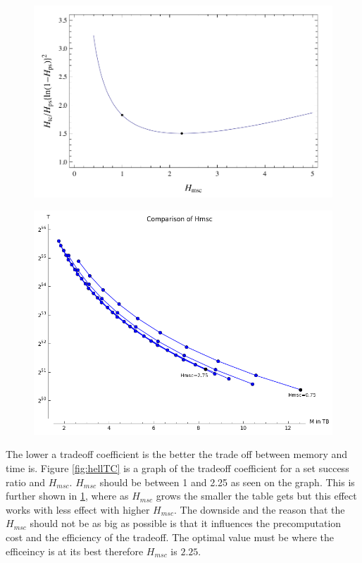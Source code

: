 \begin{figure}[H]
  \centering
  \begin{minipage}{0.45\textwidth}
    \centering
    \includegraphics[width=1.2\textwidth]{figures/HellmanTradeOff.png}
    \label{fig:hellTC}
  \end{minipage}\hfill
  \begin{minipage}{0.45\textwidth}
    \centering
    \includegraphics[width=1.2\textwidth]{figures/compareHmsc.png}
    \label{fig:hellHmsc}
  \end{minipage}
\end{figure}
The lower a tradeoff coefficient is the better the trade off between memory and time is. Figure \ref{fig:hellTC} is a graph of the tradeoff coefficient for a set success ratio and $H_{msc}$. $H_{msc}$ should be between 1 and 2.25 as seen on the graph\cite{176}. This is further shown in \ref{fig:hellHmsc}, where as $H_{msc}$ grows the smaller the table gets but this effect works with less effect with higher $H_{msc}$. The downside and the reason that the $H_{msc}$ should not be as big as possible is that it influences the precomputation cost and the efficiency of the tradeoff. The optimal value must be where the efficeincy is at its best therefore $H_{msc}$ is $2.25$.
